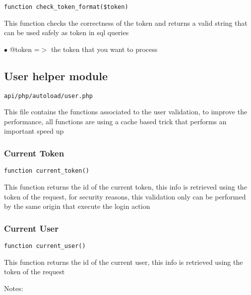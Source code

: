 \documentclass[a4paper]{article}
\begin{document}
\begin{lstlisting}
function check_token_format($token)
\end{lstlisting}

This function checks the correctness of the token and returns a valid
string that can be used safely as token in sql queries

\begin{compactitem}
\item[\color{myblue}$\bullet$] @token =$>$ the token that you want to process
\end{compactitem}

\hypertarget{toc261}{}
\subsection{User helper module}

\begin{lstlisting}
api/php/autoload/user.php
\end{lstlisting}

This file contains the functions associated to the user validation, to
improve the performance, all functions are using a cache based trick
that performs an important speed up

\hypertarget{toc262}{}
\subsubsection{Current Token}

\begin{lstlisting}
function current_token()
\end{lstlisting}

This function returns the id of the current token, this info is retrieved
using the token of the request, for security reasons, this validation only
can be performed by the same origin that execute the login action

\hypertarget{toc263}{}
\subsubsection{Current User}

\begin{lstlisting}
function current_user()
\end{lstlisting}

This function returns the id of the current user, this info is retrieved
using the token of the request

Notes:
\end{document}
